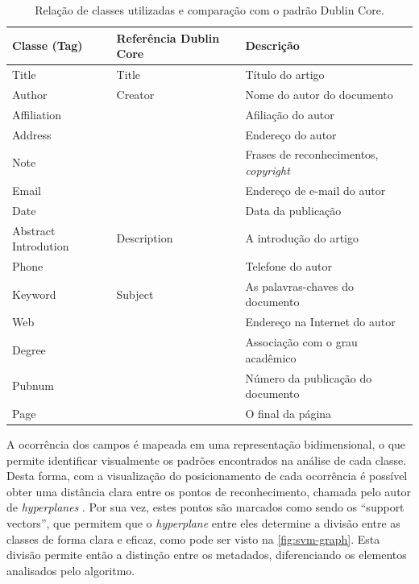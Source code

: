 \begin{table}
    \caption{Relação de classes utilizadas e comparação com o padrão Dublin Core.}
    \begin{center}
        \begin{tabular}{|C{3cm}|C{3cm}|p{7cm}|}
            \hline \textbf{Classe (Tag)} & \textbf{Referência Dublin Core} & \textbf{Descrição}\\ 
            \hline Title & Title & Título do artigo\\
            \hline Author & Creator & Nome do autor do documento\\
            \hline Affiliation & & Afiliação do autor\\
            \hline Address & & Endereço do autor\\
            \hline Note & & Frases de reconhecimentos, \textit{copyright}\\
            \hline Email & & Endereço de e-mail do autor\\
            \hline Date & & Data da publicação\\
            \hline Abstract Introdution & Description & A introdução do artigo\\
            \hline Phone & & Telefone do autor\\
            \hline Keyword & Subject & As palavras-chaves do documento\\
            \hline Web & & Endereço na Internet do autor\\
            \hline Degree & & Associação com o grau acadêmico\\
            \hline Pubnum & & Número da publicação do documento\\
            \hline Page & & O final da página\\
            \hline
        \end{tabular}
    \end{center}
    \label{tab:svm-classes}
\end{table}

A ocorrência dos campos é mapeada em uma representação bidimensional, o que permite identificar visualmente os padrões encontrados na análise de cada classe. Desta forma, com a visualização do posicionamento de cada ocorrência é possível obter uma distância clara entre os pontos de reconhecimento, chamada pelo autor de \textit{hyperplanes} \cite{Vapnik-SVM}. Por sua vez, estes pontos são marcados como sendo os ``support vectors'', que permitem que o \textit{hyperplane} entre eles determine a divisão entre as classes de forma clara e eficaz, como pode ser visto na \autoref{fig:svm-graph}. Esta divisão permite então a distinção entre os metadados, diferenciando os elementos analisados pelo algoritmo.

